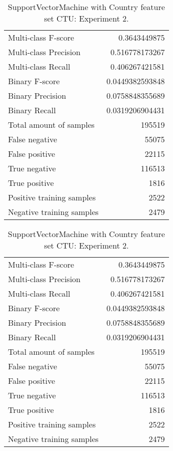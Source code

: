\begin{table}[H]
\begin{minipage}{0.5\textwidth}
\caption{SupportVectorMachine with Country feature set CTU: Experiment 1.}
\centering
\begin{tabular}{l r}
\toprule
Multi-class F-score & 0.3643449875 \\
Multi-class Precision & 0.516778173267 \\
Multi-class Recall & 0.406267421581 \\
\midrule
Binary F-score & 0.0449382593848 \\
Binary Precision & 0.0758848355689 \\
Binary Recall & 0.0319206904431 \\
\midrule
Total amount of samples & 195519 \\
False negative & 55075 \\
False positive & 22115 \\
True negative & 116513 \\
True positive & 1816 \\
\midrule
Positive training samples & 2522 \\
Negative training samples & 2479 \\
\bottomrule
\end{tabular}
\end{minipage}
\hfillx
\begin{minipage}{0.5\textwidth}
\caption{SupportVectorMachine with Country feature set CTU: Experiment 2.}
\centering
\begin{tabular}{l r}
\toprule
Multi-class F-score & 0.3643449875 \\
Multi-class Precision & 0.516778173267 \\
Multi-class Recall & 0.406267421581 \\
\midrule
Binary F-score & 0.0449382593848 \\
Binary Precision & 0.0758848355689 \\
Binary Recall & 0.0319206904431 \\
\midrule
Total amount of samples & 195519 \\
False negative & 55075 \\
False positive & 22115 \\
True negative & 116513 \\
True positive & 1816 \\
\midrule
Positive training samples & 2522 \\
Negative training samples & 2479 \\
\bottomrule
\end{tabular}
\end{minipage}
\end{table}

